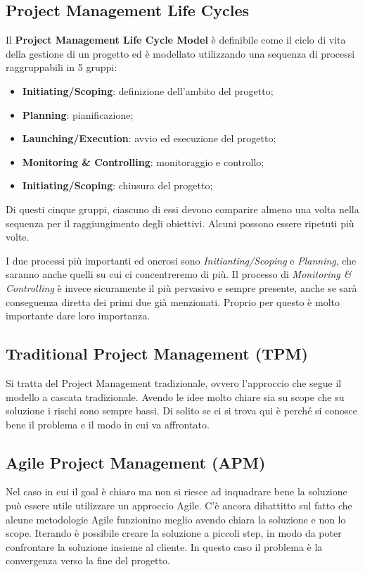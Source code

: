 \subsection{Project Management Life Cycles}
Il \textbf{Project Management Life Cycle Model} è definibile come il ciclo di vita della gestione di un progetto ed è modellato utilizzando una sequenza di processi raggruppabili in 5 gruppi:
\begin{itemize}
	\item \textbf{Initiating/Scoping}: definizione dell'ambito del progetto;
	\item \textbf{Planning}: pianificazione;
	\item \textbf{Launching/Execution}: avvio ed esecuzione del progetto;
	\item \textbf{Monitoring \& Controlling}: monitoraggio e controllo;
	\item \textbf{Initiating/Scoping}: chiusura del progetto;
\end{itemize}
Di questi cinque gruppi, ciascuno di essi devono comparire almeno una volta nella sequenza per il raggiungimento degli obiettivi. Alcuni possono essere ripetuti più volte.
\begin{info}
	I due processi più importanti ed onerosi sono \textit{Initianting/Scoping} e \textit{Planning}, che saranno anche quelli su cui ci concentreremo di più. Il processo di \textit{Monitoring \& Controlling} è invece sicuramente il più pervasivo e sempre presente, anche se sarà conseguenza diretta dei primi due già menzionati. Proprio per questo è molto importante dare loro importanza.
\end{info}
\subsection{Traditional Project Management (TPM)}
Si tratta del Project Management tradizionale, ovvero l'approccio che segue il modello a cascata tradizionale. Avendo le idee molto chiare sia su scope che su soluzione i rischi sono sempre bassi. Di solito se ci si trova qui è perché si conosce bene il problema e il modo in cui va affrontato. 
\subsection{Agile Project Management (APM)}
Nel caso in cui il goal è chiaro ma non si riesce ad inquadrare bene la soluzione può essere utile utilizzare un approccio Agile. C'è ancora dibattitto sul fatto che alcune metodologie Agile funzionino meglio avendo chiara la soluzione e non lo scope. Iterando è possibile creare la soluzione a piccoli step, in modo da poter confrontare la soluzione insieme al cliente. In questo caso il problema è la convergenza verso la fine del progetto.
